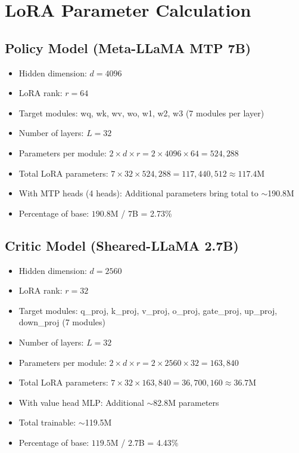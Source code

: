 \section{LoRA Parameter Calculation}
\label{app:lora}

\subsection{Policy Model (Meta-LLaMA MTP 7B)}

\begin{itemize}[nosep]
    \item Hidden dimension: $d = 4096$
    \item LoRA rank: $r = 64$
    \item Target modules: wq, wk, wv, wo, w1, w2, w3 (7 modules per layer)
    \item Number of layers: $L = 32$
    \item Parameters per module: $2 \times d \times r = 2 \times 4096 \times 64 = 524,288$
    \item Total LoRA parameters: $7 \times 32 \times 524,288 = 117,440,512 \approx 117.4$M
    \item With MTP heads (4 heads): Additional parameters bring total to $\sim$190.8M
    \item Percentage of base: $190.8$M / $7$B = 2.73\%
\end{itemize}

\subsection{Critic Model (Sheared-LLaMA 2.7B)}

\begin{itemize}[nosep]
    \item Hidden dimension: $d = 2560$
    \item LoRA rank: $r = 32$
    \item Target modules: q\_proj, k\_proj, v\_proj, o\_proj, gate\_proj, up\_proj, down\_proj (7 modules)
    \item Number of layers: $L = 32$
    \item Parameters per module: $2 \times d \times r = 2 \times 2560 \times 32 = 163,840$
    \item Total LoRA parameters: $7 \times 32 \times 163,840 = 36,700,160 \approx 36.7$M
    \item With value head MLP: Additional $\sim$82.8M parameters
    \item Total trainable: $\sim$119.5M
    \item Percentage of base: $119.5$M / $2.7$B = 4.43\%
\end{itemize}
